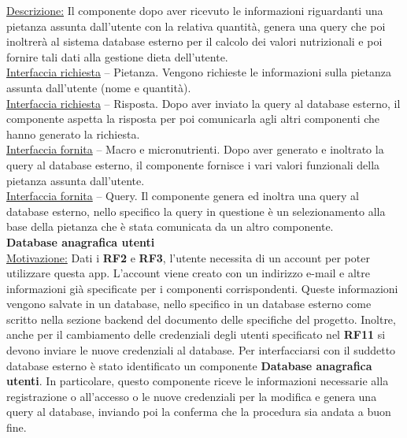 \documentclass{article}
\begin{document}
      \underline{Descrizione:} Il componente dopo aver ricevuto le informazioni riguardanti una pietanza assunta dall’utente con la relativa quantità, genera una query che poi
      inoltrerà al sistema database esterno per il calcolo dei valori nutrizionali e poi fornire tali dati alla gestione dieta dell’utente.\\

      \underline{Interfaccia richiesta} – Pietanza. Vengono richieste le informazioni sulla pietanza assunta dall’utente (nome e quantità).\\

      \underline{Interfaccia richiesta} – Risposta. Dopo aver inviato la query al database esterno, il componente aspetta la risposta per poi comunicarla agli altri componenti che
      hanno generato la richiesta.\\

      \underline{Interfaccia fornita} – Macro e micronutrienti. Dopo aver generato e inoltrato la query al database esterno, il componente fornisce i vari valori funzionali della
      pietanza assunta dall’utente.\\

      \underline{Interfaccia fornita} – Query. Il componente genera ed inoltra una query al database esterno, nello specifico la query in questione è un selezionamento alla base
      della pietanza che è stata comunicata da un altro componente.\\


      {\Large\textbf{Database anagrafica utenti}}\\

      \underline{Motivazione:} Dati i \textbf{RF2} e \textbf{RF3}, l’utente necessita di un account per poter utilizzare questa app. L’account viene creato con un indirizzo e-mail e altre informazioni
      già specificate per i componenti corrispondenti. Queste informazioni vengono salvate in un database, nello specifico in un database esterno come scritto nella sezione backend del
      documento delle specifiche del progetto. Inoltre, anche per il cambiamento delle credenziali degli utenti specificato nel \textbf{RF11} si devono inviare le nuove credenziali al database.
      Per interfacciarsi con il suddetto database esterno è stato identificato un componente \textbf{Database anagrafica utenti}. In particolare, questo componente riceve le informazioni
      necessarie alla registrazione o all’accesso  o le nuove credenziali per la modifica e genera una query al database, inviando poi la conferma che la procedura sia andata a buon
      fine.\\
\end{document}
